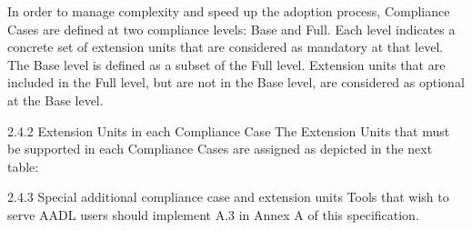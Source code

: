 In order to manage complexity and speed up the adoption process, Compliance Cases are defined at two compliance
levels: Base and Full. Each level indicates a concrete set of extension units that are considered as mandatory at that level.
The Base level is defined as a subset of the Full level. Extension units that are included in the Full level, but are not in
the Base level, are considered as optional at the Base level.

2.4.2 Extension Units in each Compliance Case
The Extension Units that must be supported in each Compliance Cases are assigned as depicted in the next table:

2.4.3 Special additional compliance case and extension units
Tools that wish to serve AADL users should implement A.3 in Annex A of this specification.

